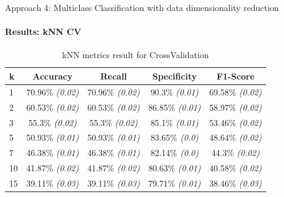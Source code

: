 \documentclass[9pt, pstricks, xcolor=dvipsnames]{beamer}
\begin{document}
\begin{frame}{Approach 4: Multiclass Classification with data dimensionality reduction}
	\framesubtitle{Results: kNN CV}
	\begin{table}[H]
		\centering
		\begin{tabular}{lcccc}
			\toprule
			k  & Accuracy                & Recall                  & Specificity             & F1-Score                \\
			\midrule
			1  & 70.96\% \textit{(0.02)} & 70.96\% \textit{(0.02)} & 90.3\% \textit{(0.01)}  & 69.58\% \textit{(0.02)} \\
			2  & 60.53\% \textit{(0.02)} & 60.53\% \textit{(0.02)} & 86.85\% \textit{(0.01)} & 58.97\% \textit{(0.02)} \\
			3  & 55.3\% \textit{(0.02)}  & 55.3\% \textit{(0.02)}  & 85.1\% \textit{(0.01)}  & 53.46\% \textit{(0.02)} \\
			5  & 50.93\% \textit{(0.01)} & 50.93\% \textit{(0.01)} & 83.65\% \textit{(0.0)}  & 48.64\% \textit{(0.02)} \\
			7  & 46.38\% \textit{(0.01)} & 46.38\% \textit{(0.01)} & 82.14\% \textit{(0.0)}  & 44.3\% \textit{(0.02)}  \\
			10 & 41.87\% \textit{(0.02)} & 41.87\% \textit{(0.02)} & 80.63\% \textit{(0.01)} & 40.58\% \textit{(0.02)} \\
			15 & 39.11\% \textit{(0.03)} & 39.11\% \textit{(0.03)} & 79.71\% \textit{(0.01)} & 38.46\% \textit{(0.03)} \\
			\bottomrule
		\end{tabular}
		\caption{kNN metrics result for CrossValidation}
		\label{tab:kNN_CV_approach4}
	\end{table}
\end{frame}
\end{document}
